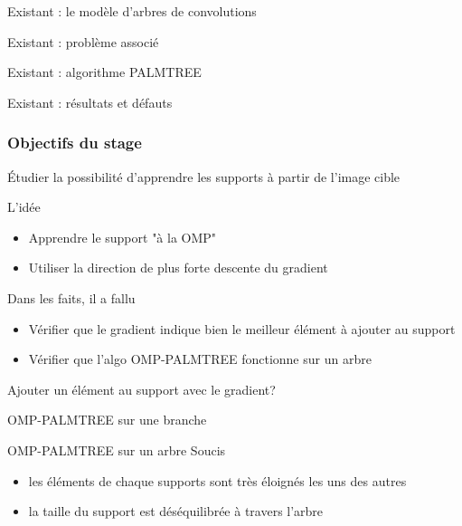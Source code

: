 
\begin{frame}{Existant : le modèle d'arbres de convolutions}

\end{frame}


\begin{frame}{Existant : problème associé}
\end{frame}


\begin{frame}{Existant : algorithme PALMTREE}
\end{frame}


\begin{frame}{Existant : résultats et défauts}
\end{frame}

\begin{frame}
	\frametitle{Objectifs du stage}
	Étudier la possibilité d'apprendre les supports à partir de l'image cible
\end{frame}



\begin{frame}{L'idée}
\begin{itemize}
	\item Apprendre le support "à la OMP"
	\item Utiliser la direction de plus forte descente du gradient
\end{itemize}
Dans les faits, il a fallu
\begin{itemize}
	\item Vérifier que le gradient indique bien le meilleur élément à ajouter au support
	\item Vérifier que l'algo OMP-PALMTREE fonctionne sur un arbre
\end{itemize}
\end{frame}


\begin{frame}{Ajouter un élément au support avec le gradient?}
\end{frame}


\begin{frame}{OMP-PALMTREE sur une branche}
\end{frame}


\begin{frame}{OMP-PALMTREE sur un arbre}
Soucis
\begin{itemize}
	\item les éléments de chaque supports sont très éloignés les uns des autres
	\item la taille du support est déséquilibrée à travers l'arbre
\end{itemize}
\end{frame}



